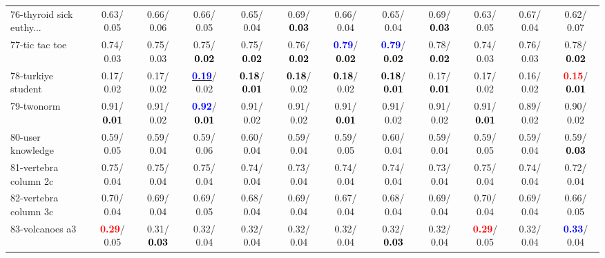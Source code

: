 \begin{table}[h]
\begin{center}
{\begin{tabular}{lc|c|c|c|c|c|c|c|c|c|c}
76-thyroid sick euthy... &   0.63/  0.05 &   0.66/  0.06 &   0.66/  0.05 &   0.65/  0.04 &   0.69/\textcolor{black}{\textbf{  0.03}} &   0.66/  0.04 &   0.65/  0.04 &   0.69/\textcolor{black}{\textbf{  0.03}} &   0.63/  0.05 &   0.67/  0.04 &   0.62/  0.07 \\
77-tic tac toe &   0.74/  0.03 &   0.75/  0.03 &   0.75/\textcolor{black}{\textbf{  0.02}} &   0.75/\textcolor{black}{\textbf{  0.02}} &   0.76/\textcolor{black}{\textbf{  0.02}} & \textcolor{blue}{\textbf{  0.79}}/\textcolor{black}{\textbf{  0.02}} & \textcolor{blue}{\textbf{  0.79}}/\textcolor{black}{\textbf{  0.02}} &   0.78/\textcolor{black}{\textbf{  0.02}} &   0.74/  0.03 &   0.76/  0.03 &   0.78/\textcolor{black}{\textbf{  0.02}} \\
78-turkiye student &   0.17/  0.02 &   0.17/  0.02 & \underline{\textcolor{blue}{\textbf{  0.19}}}/  0.02 & \textcolor{black}{\textbf{  0.18}}/\textcolor{black}{\textbf{  0.01}} & \textcolor{black}{\textbf{  0.18}}/  0.02 & \textcolor{black}{\textbf{  0.18}}/  0.02 & \textcolor{black}{\textbf{  0.18}}/\textcolor{black}{\textbf{  0.01}} &   0.17/\textcolor{black}{\textbf{  0.01}} &   0.17/  0.02 &   0.16/  0.02 & \textcolor{red}{\textbf{  0.15}}/\textcolor{black}{\textbf{  0.01}} \\ \hline
79-twonorm &   0.91/\textcolor{black}{\textbf{  0.01}} &   0.91/  0.02 & \textcolor{blue}{\textbf{  0.92}}/\textcolor{black}{\textbf{  0.01}} &   0.91/  0.02 &   0.91/  0.02 &   0.91/\textcolor{black}{\textbf{  0.01}} &   0.91/  0.02 &   0.91/  0.02 &   0.91/\textcolor{black}{\textbf{  0.01}} &   0.89/  0.02 &   0.90/  0.02 \\
80-user knowledge &   0.59/  0.05 &   0.59/  0.04 &   0.59/  0.06 &   0.60/  0.04 &   0.59/  0.04 &   0.59/  0.05 &   0.60/  0.04 &   0.59/  0.04 &   0.59/  0.05 &   0.59/  0.04 &   0.59/\textcolor{black}{\textbf{  0.03}} \\
81-vertebra column 2c &   0.75/  0.04 &   0.75/  0.04 &   0.75/  0.04 &   0.74/  0.04 &   0.73/  0.04 &   0.74/  0.04 &   0.74/  0.04 &   0.73/  0.04 &   0.75/  0.04 &   0.74/  0.04 &   0.72/  0.04 \\
82-vertebra column 3c &   0.70/  0.04 &   0.69/  0.04 &   0.69/  0.05 &   0.68/  0.04 &   0.69/  0.04 &   0.67/  0.04 &   0.68/  0.04 &   0.69/  0.04 &   0.70/  0.04 &   0.69/  0.04 &   0.66/  0.05 \\
83-volcanoes a3 & \textcolor{red}{\textbf{  0.29}}/  0.05 &   0.31/\textcolor{black}{\textbf{  0.03}} &   0.32/  0.04 &   0.32/  0.04 &   0.32/  0.04 &   0.32/  0.04 &   0.32/\textcolor{black}{\textbf{  0.03}} &   0.32/  0.04 & \textcolor{red}{\textbf{  0.29}}/  0.05 &   0.32/  0.04 & \textcolor{blue}{\textbf{  0.33}}/  0.04 \\

\end{tabular}}
\end{center}
\end{table}
